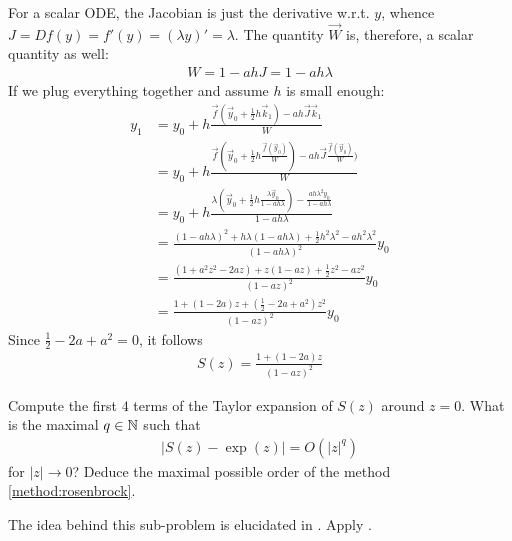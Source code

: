 \begin{problem}
\begin{subproblem}[2]
 \begin{solution}
  For a scalar ODE, the Jacobian is just the derivative w.r.t. $y$, whence $J = D f(y) = f'(y) = (\lambda y)' = \lambda$. The quantity $\vec{W}$ is, therefore, a scalar quantity as well:
  \begin{align*}
   W = 1 - a h J = 1 - a h \lambda
  \end{align*}
  If we plug everything together and assume $h$ is small enough:
  \begin{align*}
   y_1 & = y_0 + h \frac{\vec{f}(\vec{y}_0 + \frac{1}{2} h \vec{k}_1) - a h \vec{J} \vec{k}_1}{W} \\
   & = y_0 + h \frac{\vec{f}(\vec{y}_0 + \frac{1}{2} h \frac{\vec{f}(\vec{y}_0)}{W}) - a h \vec{J} \frac{\vec{f}(\vec{y}_0)}{W})}{W} \\
   & = y_0 + h \frac{\lambda (\vec{y}_0 + \frac{1}{2} h \frac{\lambda \vec{y}_0}{1 - a h \lambda}) - \frac{a h \lambda^2 y_0}{1 - a h \lambda}}{1 - a h \lambda} \\
   & = \frac{(1 - a h \lambda)^2 + h \lambda (1 - a h \lambda) + \frac{1}{2} h^2 \lambda^2 - a h^2 \lambda^2}{(1 - a h \lambda)^2} y_0 \\
   & = \frac{(1 + a^2 z^2 - 2az) + z (1 - a z) + \frac{1}{2} z^2 - a z^2}{(1 - a z)^2} y_0 \\
   & = \frac{1 + (1-2a) z +  (\frac{1}{2}-2a+ a^2) z^2}{(1 - a z)^2} y_0
  \end{align*}
  Since $\frac{1}{2}-2a+ a^2 = 0$, it follows
  \begin{align*}
   S(z) = \frac{1 + (1-2a) z}{(1 - a z)^2}
  \end{align*}
 \end{solution}
\end{subproblem}

\begin{subproblem}[3]
 Compute the first $4$ terms of the Taylor expansion of $S(z)$ around $z = 0$. What is the maximal $q \in \mathbb{N}$ such that
 \begin{align*}
  \lvert S(z) - \exp(z) \rvert = O(\lvert z \rvert^q)
 \end{align*}
 for $\lvert z \rvert \rightarrow 0$? Deduce the maximal possible 
 order of the method \eqref{method:rosenbrock}.
 
 \begin{hint}
   The idea behind this sub-problem is elucidated in . Apply
   . 
 \end{hint}


\end{subproblem}
\end{problem}
